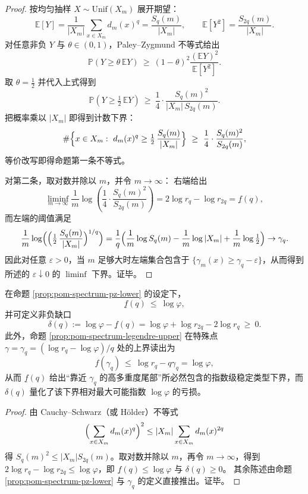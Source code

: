 \begin{proof}
按均匀抽样 \(X\sim \mathrm{Unif}(X_m)\) 展开期望：
\[
\mathbb{E}[Y]=\frac{1}{|X_m|}\sum_{x\in X_m}d_m(x)^q=\frac{S_q(m)}{|X_m|},
\qquad
\mathbb{E}[Y^2]=\frac{S_{2q}(m)}{|X_m|}.
\]
对任意非负 \(Y\) 与 \(\theta\in(0,1)\)，Paley--Zygmund 不等式给出
\[
\mathbb{P}\!\left(Y\ge \theta\,\mathbb{E}Y\right)\ \ge\ (1-\theta)^2\frac{(\mathbb{E}Y)^2}{\mathbb{E}[Y^2]}.
\]
取 \(\theta=\tfrac12\) 并代入上式得到
\[
\mathbb{P}\!\left(Y\ge \tfrac12\,\mathbb{E}Y\right)\ \ge\ \frac14\cdot\frac{S_q(m)^2}{|X_m|\,S_{2q}(m)}.
\]
把概率乘以 \(|X_m|\) 即得到计数下界：
\[
\#\Bigl\{x\in X_m:\ d_m(x)^q\ge \tfrac12\,\frac{S_q(m)}{|X_m|}\Bigr\}
\ \ge\ \frac14\cdot\frac{S_q(m)^2}{S_{2q}(m)},
\]
等价改写即得命题第一条不等式。
\par
对第二条，取对数并除以 \(m\)，并令 \(m\to\infty\)：
右端给出
\[
\liminf_{m\to\infty}\frac1m\log\!\left(\frac14\cdot\frac{S_q(m)^2}{S_{2q}(m)}\right)
=2\log r_q-\log r_{2q}=\underline f(q),
\]
而左端的阈值满足
\[
\frac1m\log\Bigl(\Bigl(\tfrac12\,\frac{S_q(m)}{|X_m|}\Bigr)^{1/q}\Bigr)
=\frac{1}{q}\Bigl(\frac1m\log S_q(m)-\frac1m\log|X_m|+\frac1m\log\tfrac12\Bigr)
\to \gamma_q.
\]
因此对任意 \(\varepsilon>0\)，当 \(m\) 足够大时左端集合包含于 \(\{\gamma_m(x)\ge \gamma_q-\varepsilon\}\)，从而得到所述的 \(\varepsilon\downarrow 0\) 的 \(\liminf\) 下界。证毕。
\end{proof}

\begin{corollary}\label{cor:pom-spectrum-intermittency-deficit}
在命题 \ref{prop:pom-spectrum-pz-lower} 的设定下，
\[
\underline f(q)\ \le\ \log\varphi,
\]
并可定义非负缺口
\[
\boxed{\;
\delta(q):=\log\varphi-\underline f(q)
=\log\varphi+\log r_{2q}-2\log r_q\ \ge\ 0.\;}
\]
此外，命题 \ref{prop:pom-spectrum-legendre-upper} 在特殊点
\(
\gamma=\gamma_q=(\log r_q-\log\varphi)/q
\)
处的上界读出为
\[
f(\gamma_q)\ \le\ \log r_q-q\gamma_q=\log\varphi,
\]
从而 \(\underline f(q)\) 给出“靠近 \(\gamma_q\) 的高多重度尾部”所必然包含的指数级稳定类型下界，而 \(\delta(q)\) 量化了该下界相对最大可能指数 \(\log\varphi\) 的亏损。
\end{corollary}
\begin{proof}
由 Cauchy--Schwarz（或 Hölder）不等式
\[
\Bigl(\sum_{x\in X_m}d_m(x)^q\Bigr)^2\le |X_m|\sum_{x\in X_m}d_m(x)^{2q}
\]
得 \(S_q(m)^2\le |X_m|S_{2q}(m)\)。取对数并除以 \(m\)，再令 \(m\to\infty\)，得到
\(
2\log r_q-\log r_{2q}\le \log\varphi
\)，即 \(\underline f(q)\le\log\varphi\) 与 \(\delta(q)\ge 0\)。
其余陈述由命题 \ref{prop:pom-spectrum-pz-lower} 与 \(\gamma_q\) 的定义直接推出。证毕。
\end{proof}

